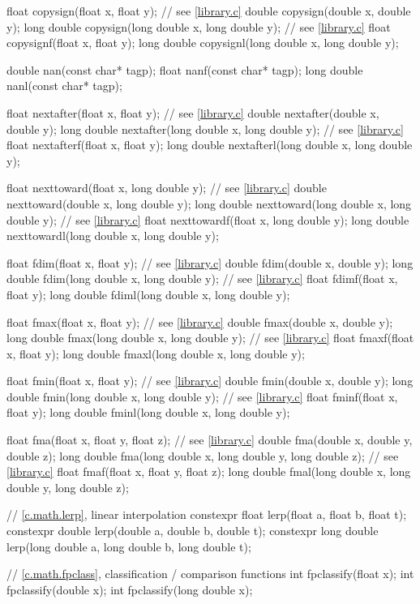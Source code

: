 \begin{codeblock}
{  float copysign(float x, float y);  // see \ref{library.c}
  double copysign(double x, double y);
  long double copysign(long double x, long double y);  // see \ref{library.c}
  float copysignf(float x, float y);
  long double copysignl(long double x, long double y);

  double nan(const char* tagp);
  float nanf(const char* tagp);
  long double nanl(const char* tagp);

  float nextafter(float x, float y);  // see \ref{library.c}
  double nextafter(double x, double y);
  long double nextafter(long double x, long double y);  // see \ref{library.c}
  float nextafterf(float x, float y);
  long double nextafterl(long double x, long double y);

  float nexttoward(float x, long double y);  // see \ref{library.c}
  double nexttoward(double x, long double y);
  long double nexttoward(long double x, long double y);  // see \ref{library.c}
  float nexttowardf(float x, long double y);
  long double nexttowardl(long double x, long double y);

  float fdim(float x, float y);  // see \ref{library.c}
  double fdim(double x, double y);
  long double fdim(long double x, long double y);  // see \ref{library.c}
  float fdimf(float x, float y);
  long double fdiml(long double x, long double y);

  float fmax(float x, float y);  // see \ref{library.c}
  double fmax(double x, double y);
  long double fmax(long double x, long double y);  // see \ref{library.c}
  float fmaxf(float x, float y);
  long double fmaxl(long double x, long double y);

  float fmin(float x, float y);  // see \ref{library.c}
  double fmin(double x, double y);
  long double fmin(long double x, long double y);  // see \ref{library.c}
  float fminf(float x, float y);
  long double fminl(long double x, long double y);

  float fma(float x, float y, float z);  // see \ref{library.c}
  double fma(double x, double y, double z);
  long double fma(long double x, long double y, long double z);  // see \ref{library.c}
  float fmaf(float x, float y, float z);
  long double fmal(long double x, long double y, long double z);

  // \ref{c.math.lerp}, linear interpolation
  constexpr float lerp(float a, float b, float t);
  constexpr double lerp(double a, double b, double t);
  constexpr long double lerp(long double a, long double b, long double t);

  // \ref{c.math.fpclass}, classification / comparison functions
  int fpclassify(float x);
  int fpclassify(double x);
  int fpclassify(long double x);

}
\end{codeblock}
